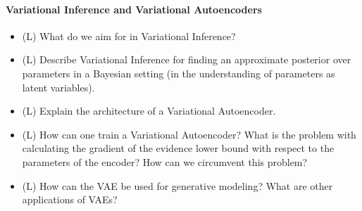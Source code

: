 \paragraph*{Variational Inference and Variational Autoencoders}

\begin{itemize}
    \item (L) What do we aim for in Variational Inference?
    \answerboxM
    \item (L) Describe Variational Inference for finding an approximate posterior over parameters in a Bayesian setting (in the understanding of parameters as latent variables).
    \answerboxL
    \item (L) Explain the architecture of a Variational Autoencoder.
    \answerboxL
    \item (L) How can one train a Variational Autoencoder? What is the problem with calculating the gradient of the evidence lower bound with
    respect to the parameters of the encoder? How can we circumvent this problem?
    \answerboxL
    \item (L) How can the VAE be used for generative modeling? What are other applications of VAEs?
    \answerboxM
\end{itemize}

\pagebreak